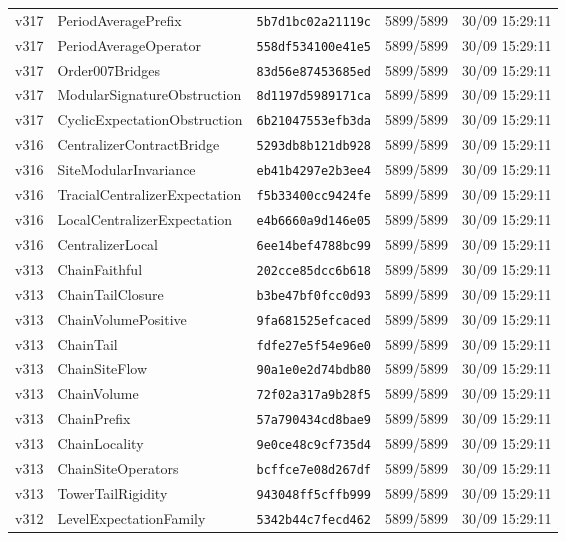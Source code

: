 \documentclass[11pt]{article}
\theoremstyle{definition}\newtheorem{deriv}{Derivação}
\begin{document}
{\begin{longtable}{@{}lllll@{}}
v317 & PeriodAveragePrefix & \texttt{5b7d1bc02a21119c} & 5899/5899 & 30/09 15:29:11 \\
v317 & PeriodAverageOperator & \texttt{558df534100e41e5} & 5899/5899 & 30/09 15:29:11 \\
v317 & Order007Bridges & \texttt{83d56e87453685ed} & 5899/5899 & 30/09 15:29:11 \\
v317 & ModularSignatureObstruction & \texttt{8d1197d5989171ca} & 5899/5899 & 30/09 15:29:11 \\
v317 & CyclicExpectationObstruction & \texttt{6b21047553efb3da} & 5899/5899 & 30/09 15:29:11 \\
v316 & CentralizerContractBridge & \texttt{5293db8b121db928} & 5899/5899 & 30/09 15:29:11 \\
v316 & SiteModularInvariance & \texttt{eb41b4297e2b3ee4} & 5899/5899 & 30/09 15:29:11 \\
v316 & TracialCentralizerExpectation & \texttt{f5b33400cc9424fe} & 5899/5899 & 30/09 15:29:11 \\
v316 & LocalCentralizerExpectation & \texttt{e4b6660a9d146e05} & 5899/5899 & 30/09 15:29:11 \\
v316 & CentralizerLocal & \texttt{6ee14bef4788bc99} & 5899/5899 & 30/09 15:29:11 \\
v313 & ChainFaithful & \texttt{202cce85dcc6b618} & 5899/5899 & 30/09 15:29:11 \\
v313 & ChainTailClosure & \texttt{b3be47bf0fcc0d93} & 5899/5899 & 30/09 15:29:11 \\
v313 & ChainVolumePositive & \texttt{9fa681525efcaced} & 5899/5899 & 30/09 15:29:11 \\
v313 & ChainTail & \texttt{fdfe27e5f54e96e0} & 5899/5899 & 30/09 15:29:11 \\
v313 & ChainSiteFlow & \texttt{90a1e0e2d74bdb80} & 5899/5899 & 30/09 15:29:11 \\
v313 & ChainVolume & \texttt{72f02a317a9b28f5} & 5899/5899 & 30/09 15:29:11 \\
v313 & ChainPrefix & \texttt{57a790434cd8bae9} & 5899/5899 & 30/09 15:29:11 \\
v313 & ChainLocality & \texttt{9e0ce48c9cf735d4} & 5899/5899 & 30/09 15:29:11 \\
v313 & ChainSiteOperators & \texttt{bcffce7e08d267df} & 5899/5899 & 30/09 15:29:11 \\
v313 & TowerTailRigidity & \texttt{943048ff5cffb999} & 5899/5899 & 30/09 15:29:11 \\
v312 & LevelExpectationFamily & \texttt{5342b44c7fecd462} & 5899/5899 & 30/09 15:29:11 \\

\end{longtable}}
\end{document}
